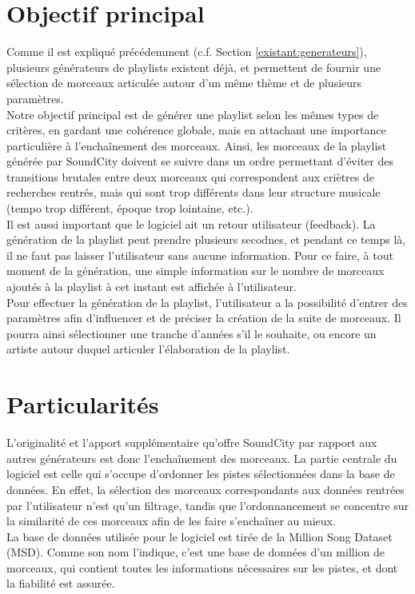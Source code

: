 
\section{Objectif principal}
\label{objectifs:principal}

Comme il est expliqué précédemment (c.f. Section \ref{existant:generateurs}), 
plusieurs générateurs de playlists existent déjà, et permettent de fournir une 
sélection de morceaux articulée autour d'un même thème et de plusieurs 
paramètres.\\

Notre objectif principal est de générer une playlist selon les mêmes types 
de critères, en gardant une cohérence globale, mais en attachant une 
importance particulière à l'enchaînement des morceaux. Ainsi, les morceaux 
de la playlist générée par SoundCity doivent se suivre dans un ordre permettant 
d'éviter des transitions brutales entre deux morceaux qui correspondent aux 
criètres de recherches rentrés, mais qui sont trop différents dans leur 
structure musicale (tempo trop différent, époque trop lointaine, etc.).\\

Il est aussi important que le logiciel ait un retour 
utilisateur (feedback). La génération de la playlist peut prendre plusieurs 
secodnes, et pendant ce temps là, il ne faut pas 
laisser l'utilisateur sans aucune information. Pour ce faire, à tout moment 
de la génération, une simple information sur le nombre de morceaux ajoutés à 
la playlist à cet instant est affichée à l'utilisateur.\\

Pour effectuer la génération de la playlist, l'utilisateur a la possibilité 
d'entrer des paramètres afin d'influencer et de préciser la création de la 
suite de morceaux. Il pourra ainsi sélectionner une tranche d'années s'il le 
souhaite, ou encore un artiste autour duquel articuler l'élaboration de la 
playlist.


\section{Particularités}
\label{objectifs:particularites}

L'originalité et l'apport supplémentaire qu'offre SoundCity par rapport aux 
autres générateurs est donc l'enchaînement des morceaux. La partie centrale 
du logiciel est celle qui s'occupe d'ordonner les pistes sélectionnées 
dans la base de données. En effet, la sélection des morceaux correspondants 
aux données rentrées par l'utilisateur n'est qu'un filtrage, tandis que 
l'ordonnancement se concentre sur la similarité de ces morceaux afin de les 
faire s'enchaîner au mieux.\\

La base de données utilisée pour le logiciel est tirée de la Million Song 
Dataset (MSD). Comme son nom l'indique, c'est une base de données d'un 
million de morceaux, qui contient toutes les informations 
nécessaires sur les pistes, et dont la fiabilité est assurée.
